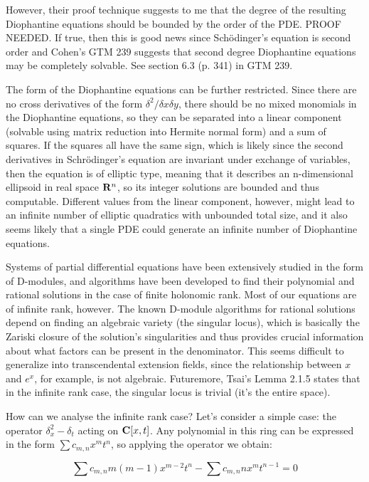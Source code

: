 \documentclass{article}
\newcommand{\C}{\ensuremath{{\bf C}}}
\newcommand{\R}{\ensuremath{{\bf R}}}
\begin{document}
However, their proof technique suggests to me that the degree of the
resulting Diophantine equations should be bounded by the order of the
PDE.  PROOF NEEDED.  If true, then this is good news since Sch\"odinger's
equation is second order and Cohen's GTM 239 suggests that second
degree Diophantine equations may be completely solvable.  See
section 6.3 (p. 341) in GTM 239.

The form of the Diophantine equations can be further restricted.
Since there are no cross derivatives of the form $\delta^2/\delta x \delta y$,
there should be no mixed monomials in the Diophantine equations,
so they can be separated into a linear component (solvable using
matrix reduction into Hermite normal form) and a sum of squares.
If the squares all have the same sign, which is likely since
the second derivatives in Schr\" odinger's equation are invariant
under exchange of variables, then the equation is of elliptic
type, meaning that it describes an n-dimensional ellipsoid
in real space $\R^n$, so its integer solutions are bounded
and thus computable.  Different values from the linear
component, however, might lead to an infinite number of
elliptic quadratics with unbounded total size, and it
also seems likely that a single PDE could generate an
infinite number of Diophantine equations.

Systems of partial differential equations have been extensively
studied in the form of D-modules, and algorithms have been developed
to find their polynomial and rational solutions in the case of finite
holonomic rank.  Most of our equations are of infinite rank, however.
The known D-module algorithms for rational solutions depend on finding
an algebraic variety (the singular locus), which is basically the
Zariski closure of the solution's singularities and thus provides
crucial information about what factors can be present in the
denominator.  This seems difficult to generalize into transcendental
extension fields, since the relationship between $x$ and $e^x$, for
example, is not algebraic.  Futuremore, Tsai's Lemma 2.1.5 states that in
the infinite rank case, the singular locus is trivial (it's the entire space).

How can we analyse the infinite rank case?  Let's consider a simple
case: the operator $\delta_x^2 - \delta_t$ acting on $\C[x,t]$.
Any polynomial in this ring can be expressed in the form $\sum c_{m,n} x^m t^n$,
so applying the operator we obtain:

$$\sum c_{m,n} m(m-1) x^{m-2} t^n - \sum c_{m,n} n x^m t^{n-1} = 0$$
\end{document}
